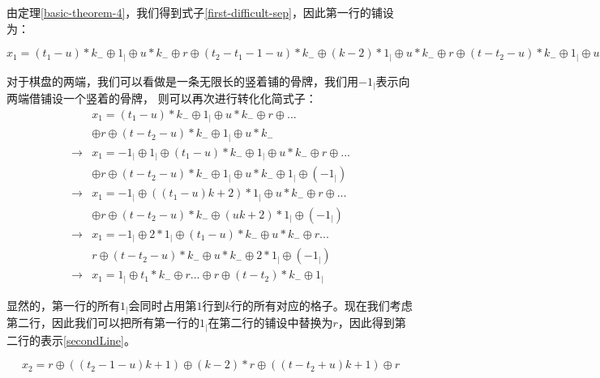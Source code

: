 由定理\ref*{basic-theorem-4}，我们得到式子\ref*{first-difficult-sep}，因此第一行的铺设为：

$x_1 = (t_1 - u) * k_{-}  \oplus 1_{\vert} \oplus u * k_{-} \oplus r \oplus  (t_2 - t_1 - 1 - u) * k_{-}  \oplus
    (k - 2) * 1_{\vert} \oplus u * k_{-} \oplus r \oplus (t - t_2 - u) * k_{-}  \oplus 1_{\vert} \oplus u * k_{-}$

对于棋盘的两端，我们可以看做是一条无限长的竖着铺的骨牌，我们用$-1_{\vert}$表示向两端借铺设一个竖着的骨牌，
则可以再次进行转化化简式子：
$$
    \begin{aligned}
                    & x_1 = (t_1 - u) * k_{-}  \oplus 1_{\vert} \oplus u * k_{-} \oplus r \oplus ...                                    \\
                    & \oplus r \oplus (t - t_2 - u) * k_{-}  \oplus 1_{\vert} \oplus u * k_{-}                                          \\
        \rightarrow & x_1 = -1_{\vert} \oplus 1_{\vert} \oplus (t_1 - u) * k_{-}  \oplus 1_{\vert} \oplus u * k_{-} \oplus r \oplus ... \\
                    & \oplus r \oplus (t - t_2 - u) * k_{-}  \oplus 1_{\vert} \oplus u * k_{-} \oplus 1_{\vert} \oplus (-1_{\vert})     \\
        \rightarrow & x_1 = -1_{\vert} \oplus ((t_1 - u)k + 2)  * 1_{\vert} \oplus u * k_{-} \oplus r \oplus ...                        \\
                    & \oplus r \oplus (t - t_2 - u) * k_{-}  \oplus  (uk + 2) * 1_{\vert} \oplus (-1_{\vert})                           \\
        \rightarrow & x_1 = -1_{\vert} \oplus 2 * 1_{\vert} \oplus (t_1 - u) * k_{-}  \oplus u * k_{-} \oplus r ...                     \\
                    & r \oplus (t - t_2 - u) * k_{-}  \oplus  u * k_{-} \oplus 2 * 1_{\vert} \oplus (-1_{\vert})                        \\
        \rightarrow & x_1 = 1_{\vert} \oplus  t_1 * k_{-} \oplus r ... \oplus r \oplus (t - t_2) * k_{-} \oplus 1_{\vert}
    \end{aligned}
$$

显然的，第一行的所有$1_{\vert}$会同时占用第$1$行到$k$行的所有对应的格子。现在我们考虑第二行，因此我们可以把所有第一行的$1_{\vert}$在第二行的铺设中替换为$r$，因此得到第二行的表示\ref{secondLine}。

\begin{equation}
    x_2 = r \oplus ((t_2 - 1 - u)k + 1) \oplus (k - 2) * r \oplus ((t - t_2 + u)k + 1) \oplus r
    \label{secondLine}
\end{equation}


